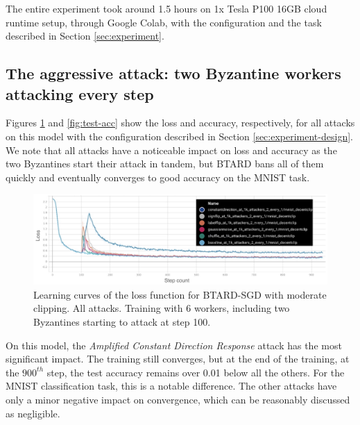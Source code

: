 \documentclass{article}
\begin{document}
The entire experiment took around 1.5 hours on 1x Tesla P100 16GB cloud runtime setup, through Google Colab, with the configuration and the task described in Section \ref{sec:experiment}.

\subsection{The aggressive attack: two Byzantine workers attacking every step}

Figures \ref{fig:learning-curve} and \ref{fig:test-acc} show the loss and accuracy, respectively, for all attacks on this model with the configuration described in Section \ref{sec:experiment-design}. We note that all attacks have a noticeable impact on loss and accuracy as the two Byzantines start their attack in tandem, but BTARD bans all of them quickly and eventually converges to good accuracy on the MNIST task.

\begin{figure}[h!]
\centering
\includegraphics[width=\textwidth]{figs/aggressive_attack_loss.jpg}
\caption{Learning curves of the loss function for BTARD-SGD with moderate clipping. All attacks. Training with 6 workers, including two Byzantines starting to attack at step 100.}
\label{fig:learning-curve}
\end{figure}

On this model, the \textit{Amplified Constant Direction Response} attack has the most significant impact. The training still converges, but at the end of the training, at the $900^{th}$ step, the test accuracy remains over 0.01 below all the others. For the MNIST classification task, this is a notable difference. The other attacks have only a minor negative impact on convergence, which can be reasonably discussed as negligible.
\end{document}
